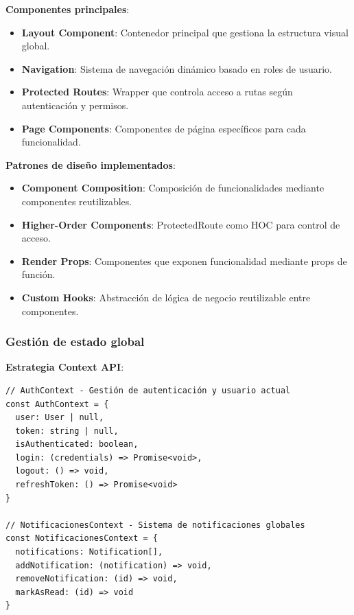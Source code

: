 \documentclass[12pt,a4paper,oneside]{report}
\providecommand{\tightlist}{%
  \setlength{\itemsep}{0pt}\setlength{\parskip}{0pt}}
\begin{document}
\textbf{Componentes principales}:

\begin{itemize}
\tightlist
\item
  \textbf{Layout Component}: Contenedor principal que gestiona la
  estructura visual global.
\item
  \textbf{Navigation}: Sistema de navegación dinámico basado en roles de
  usuario.
\item
  \textbf{Protected Routes}: Wrapper que controla acceso a rutas según
  autenticación y permisos.
\item
  \textbf{Page Components}: Componentes de página específicos para cada
  funcionalidad.
\end{itemize}

\textbf{Patrones de diseño implementados}:

\begin{itemize}
\tightlist
\item
  \textbf{Component Composition}: Composición de funcionalidades
  mediante componentes reutilizables.
\item
  \textbf{Higher-Order Components}: ProtectedRoute como HOC para control
  de acceso.
\item
  \textbf{Render Props}: Componentes que exponen funcionalidad mediante
  props de función.
\item
  \textbf{Custom Hooks}: Abstracción de lógica de negocio reutilizable
  entre componentes.
\end{itemize}

\subsubsection{Gestión de estado
global}\label{gestiuxf3n-de-estado-global}

\textbf{Estrategia Context API}:

\begin{lstlisting}
// AuthContext - Gestión de autenticación y usuario actual
const AuthContext = {
  user: User | null,
  token: string | null,
  isAuthenticated: boolean,
  login: (credentials) => Promise<void>,
  logout: () => void,
  refreshToken: () => Promise<void>
}

// NotificacionesContext - Sistema de notificaciones globales
const NotificacionesContext = {
  notifications: Notification[],
  addNotification: (notification) => void,
  removeNotification: (id) => void,
  markAsRead: (id) => void
}
\end{lstlisting}
\end{document}

